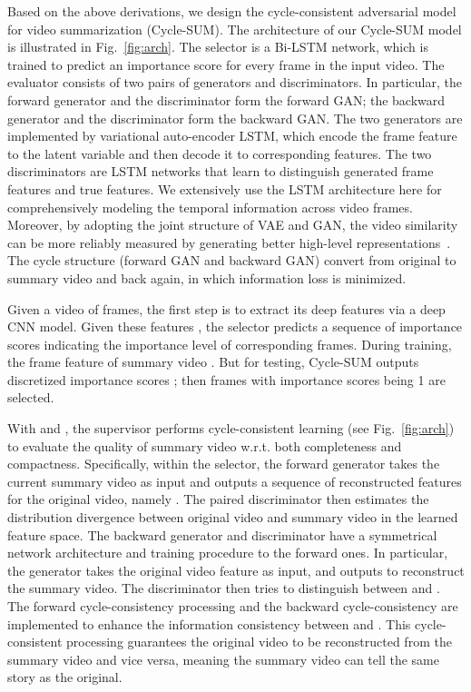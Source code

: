\documentclass[letterpaper]{article} \usepackage{aaai19}  \usepackage{times}  \usepackage{helvet}  \usepackage{courier}  \usepackage{url}  \usepackage{graphicx}  \frenchspacing  \setlength{\pdfpagewidth}{8.5in}  \setlength{\pdfpageheight}{11in}  \usepackage{amsmath}
\begin{document}
Based on the above derivations, we design the cycle-consistent adversarial model for video summarization (Cycle-SUM). The architecture of our Cycle-SUM model is illustrated in Fig.~\ref{fig:arch}. The selector is a Bi-LSTM network, which is trained to predict an importance score for every frame in the input video. The evaluator consists of two pairs of generators and discriminators. In particular, the forward generator  and the discriminator  form the forward GAN; the backward generator  and the discriminator  form the backward GAN. The two generators are implemented by variational auto-encoder LSTM, which encode the frame feature to the latent variable  and then decode it to corresponding features.  The two discriminators are LSTM networks that learn to distinguish generated frame features and true features. We extensively use the LSTM architecture here for comprehensively modeling the temporal information across video frames. Moreover, by adopting the joint structure of VAE and GAN, the video similarity can be more reliably measured by generating better high-level representations~\cite{larsen2015autoencoding}. The cycle structure (forward GAN and backward GAN) convert from original to summary video and back again, in which information loss is minimized.

Given a video  of  frames, the first step is to extract its deep features  via a deep CNN model. Given these features ,  the selector predicts a sequence of importance scores  indicating the importance level of corresponding frames. During training, the frame feature of summary video . But for testing, Cycle-SUM outputs discretized importance scores ; then frames with importance scores being 1 are selected.


With  and , the supervisor performs  cycle-consistent learning  (see Fig.~\ref{fig:arch}) to evaluate the quality of summary video  w.r.t. both completeness and compactness.  Specifically, within the selector, the forward generator   takes the current summary video   as input and outputs a sequence of reconstructed features for the original video, namely . The paired discriminator  then estimates the distribution divergence  between original video and summary video in the learned feature space.  The backward generator  and discriminator   have a symmetrical network architecture and training procedure to the forward ones. In particular, the generator  takes the original video feature  as input, and outputs  to reconstruct the summary video. The discriminator  then tries to distinguish between  and . The forward cycle-consistency processing  and the backward cycle-consistency  are implemented to enhance the information consistency between  and . This cycle-consistent processing guarantees the original video to be reconstructed from the summary video and vice versa, meaning the summary video can tell the same story as the original.
\end{document}
